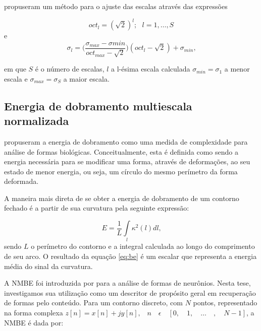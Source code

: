  propuseram um método para o ajuste das escalas através das expressões

\begin{equation}
oct_l = (\sqrt{2})^l;\text{ }l = 1,\ldots,S
\end{equation} 
\noindent e
\begin{equation}
\sigma_l = \big(\frac{\sigma_{max} - \sigma{min}}{oct_{max}-\sqrt{2}}\big)(oct_l - \sqrt{2})+\sigma_{min}\text{,}
\end{equation}

\noindent em que $S$ é o número de escalas, $l$ a l-ésima escala calculada $\sigma_{min} = \sigma_1$ a menor escala e $\sigma_{max} = \sigma_S$ a maior escala.

\subsection*{Energia de dobramento multiescala normalizada\label{subsec:BE}}

 propuseram a energia de dobramento como uma medida de complexidade para análise de formas biológicas. Conceitualmente, esta é definida como sendo a energia necessária para se modificar uma forma, através de deformações, ao seu estado de menor energia, ou seja, um círculo do mesmo perímetro da forma deformada.

A maneira mais direta de se obter a energia de dobramento de um contorno fechado é a partir de sua curvatura pela seguinte expressão:

\begin{equation}\label{eq:be}
E = \frac{1}{L}\int\limits_{l}\kappa^2(l)dl\text{,}
\end{equation}
\noindent
sendo $L$ o perímetro do contorno e a integral calculada ao longo do comprimento de seu arco. O resultado da equação \ref{eq:be} é um escalar que representa a energia média do sinal da curvatura.

\begin{comment}
A energia de dobramento multiescala é obtida a partir da curvatura multiescala repetindo-se o cálculo da equação \ref{eq:be} para diferentes níveis de suavização do contorno. Isso resulta em um vetor de características composto por escalares decorrentes da curvatura multiescala para cada uma das escalas empregadas na suavização do contorno e cálculo da curvatura. 
\end{comment}

A \acl{NMBE} foi introduzida por  para a análise de formas de neurônios. Nesta tese, investigamos sua utilização como um descritor de propósito geral em recuperação de formas pelo conteúdo. Para um contorno discreto, com $N$ pontos, representado na forma complexa $z[n] = x[n]+jy[n] \text{,} \quad n \quad \epsilon \quad [0, \quad 1, \quad \ldots \quad , \quad N-1]$, a \ac{NMBE} é dada por: 

